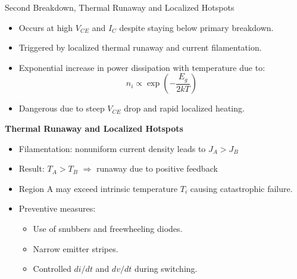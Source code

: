 \begin{frame}{Second Breakdown, Thermal Runaway and Localized Hotspots}
\begin{itemize}
  \item Occurs at high $V_{CE}$ and $I_C$ despite staying below primary breakdown.
  \item Triggered by localized thermal runaway and current filamentation.
  \item Exponential increase in power dissipation with temperature due to:
  \[
  n_i \propto \exp\left(-\frac{E_g}{2kT}\right)
  \]
  \item Dangerous due to steep $V_{CE}$ drop and rapid localized heating.
\end{itemize}
\textbf{Thermal Runaway and Localized Hotspots}
\begin{itemize}
  \item Filamentation: nonuniform current density leads to $J_A > J_B$
  \item Result: $T_A > T_B$ $\Rightarrow$ runaway due to positive feedback
  \item Region A may exceed intrinsic temperature $T_i$ causing catastrophic failure.
  \item Preventive measures:
  \begin{itemize}
    \item Use of snubbers and freewheeling diodes.
    \item Narrow emitter stripes.
    \item Controlled $di/dt$ and $dv/dt$ during switching.
  \end{itemize}
\end{itemize}
\end{frame}


